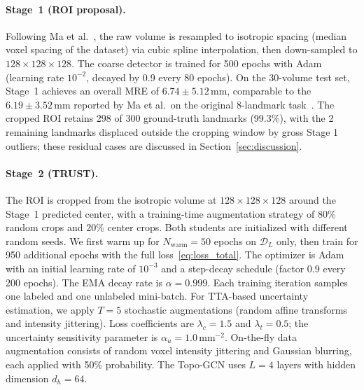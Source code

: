\documentclass[conference]{IEEEtran}
\begin{document}
\paragraph{Stage~1 (ROI proposal).}
Following Ma et al.~\cite{Ma2023_aortic_landmarks}, the raw volume is resampled to isotropic spacing (median voxel spacing of the dataset) via cubic spline interpolation, then down-sampled to $128 \times 128 \times 128$. The coarse detector is trained for 500 epochs with Adam (learning rate $10^{-2}$, decayed by 0.9 every 80 epochs). On the 30-volume test set, Stage~1 achieves an overall MRE of $6.74 \pm 5.12$\,mm, comparable to the $6.19 \pm 3.52$\,mm reported by Ma et al.\ on the original 8-landmark task~\cite{Ma2023_aortic_landmarks}. The cropped ROI retains 298 of 300 ground-truth landmarks (99.3\%), with the 2 remaining landmarks displaced outside the cropping window by gross Stage 1 outliers; these residual cases are discussed in Section~\ref{sec:discussion}.

\paragraph{Stage~2 (TRUST).}
The ROI is cropped from the isotropic volume at $128 \times 128 \times 128$ around the Stage~1 predicted center, with a training-time augmentation strategy of 80\% random crops and 20\% center crops. Both students are initialized with different random seeds. We first warm up for $N_{\mathrm{warm}} = 50$ epochs on $\mathcal{D}_L$ only, then train for 950 additional epochs with the full loss~\eqref{eq:loss_total}. The optimizer is Adam with an initial learning rate of $10^{-3}$ and a step-decay schedule (factor 0.9 every 200 epochs). The EMA decay rate is $\alpha = 0.999$. Each training iteration samples one labeled and one unlabeled mini-batch. For TTA-based uncertainty estimation, we apply $T = 5$ stochastic augmentations (random affine transforms and intensity jittering). Loss coefficients are $\lambda_c = 1.5$ and $\lambda_t = 0.5$; the uncertainty sensitivity parameter is $\alpha_u = 1.0$\,mm$^{-2}$. On-the-fly data augmentation consists of random voxel intensity jittering and Gaussian blurring, each applied with 50\% probability. The Topo-GCN uses $L = 4$ layers with hidden dimension $d_h = 64$.
\end{document}

